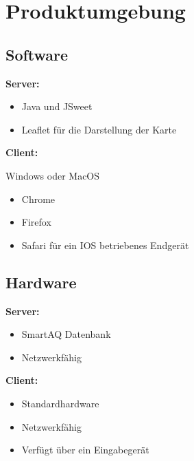 \section{Produktumgebung}
\subsection{Software}
\item \textbf{Server:}
\begin{itemize}
    \item Java und JSweet
    \item Leaflet für die Darstellung der Karte
\end{itemize}
\item \textbf{ Client:}
\item Windows oder MacOS
\begin{itemize}
    \item Chrome
    \item Firefox 
    \item Safari für ein IOS betriebenes \gls{Endgerät}
\end{itemize}
\subsection{Hardware}
\item \textbf{Server:}
\begin{itemize}
    \item SmartAQ Datenbank
    \item Netzwerkfähig 
\end{itemize}
\item \textbf{Client:}
\begin{itemize}
    \item Standardhardware
    \item Netzwerkfähig 
    \item Verfügt über ein Eingabegerät
\end{itemize}